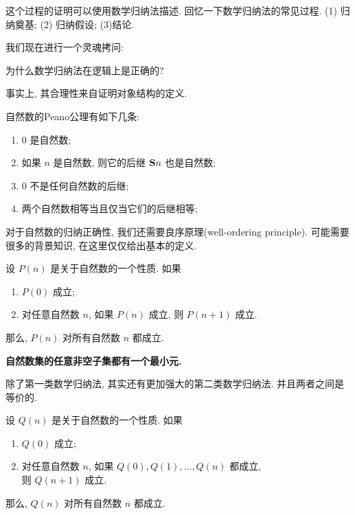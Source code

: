这个过程的证明可以使用数学归纳法描述. 回忆一下数学归纳法的常见过程. (1) 归纳奠基; (2) 归纳假设; (3)结论. 

我们现在进行一个灵魂拷问: 

\begin{bonus}
	为什么数学归纳法在逻辑上是正确的? 
\end{bonus}

事实上, 其合理性来自证明对象结构的定义. 

\begin{definition}[Peano 公理]
    自然数的Peano公理有如下几条: 
    \begin{enumerate}
      \item 0 是自然数;
      \item 如果 $n$ 是自然数, 则它的后继 ${\bf S}n$ 也是自然数;
      \item 0 不是任何自然数的后继;
      \item 两个自然数相等当且仅当它们的后继相等;
    \end{enumerate}
\end{definition}


对于自然数的归纳正确性, 我们还需要良序原理(well-ordering principle). 可能需要很多的背景知识, 在这里仅仅给出基本的定义. 

\begin{theorem}
    设 $P(n)$ 是关于自然数的一个性质. 
    如果
    \begin{enumerate}
      \item $P(0)$ 成立;
      \item 对任意自然数 $n$, 如果 $P(n)$ 成立, 则 $P(n+1)$ 成立. 
    \end{enumerate}
    那么, $P(n)$ 对所有自然数 $n$ 都成立. 
\end{theorem}

\begin{definition}
    \bf{自然数集}的任意\bf{非空}子集都有一个最小元. 
\end{definition}

除了第一类数学归纳法, 其实还有更加强大的第二类数学归纳法. 并且两者之间是等价的. 

\begin{theorem}
    设 $Q(n)$ 是关于自然数的一个性质. 
    如果
    \begin{enumerate}
      \item $Q(0)$ 成立;
      \item 对任意自然数 $n$, 如果 $Q(0), Q(1), \dots, Q(n)$ 都成立, \\ 则 $Q(n+1)$ 成立. 
    \end{enumerate}
    那么, $Q(n)$ 对所有自然数 $n$ 都成立. 
  \end{theorem}
  
